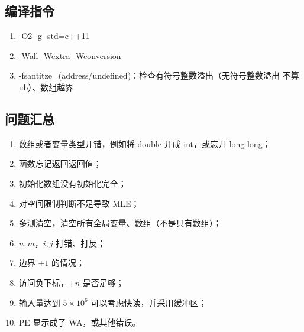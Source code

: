 \subsection{编译指令}
\begin{enumerate}
    \item -O2 -g -std=c++11
    \item -Wall -Wextra -Wconversion
    \item -fsantitze=(address/undefined)：检查有符号整数溢出（无符号整数溢出
        不算 ub）、数组越界
\end{enumerate}
\subsection{问题汇总}
\begin{enumerate}
  \item 数组或者变量类型开错，例如将 double 开成 int，或忘开 long long；
  \item 函数忘记返回返回值；
  \item 初始化数组没有初始化完全；
  \item 对空间限制判断不足导致 MLE；
  \item 多测清空，清空所有全局变量、数组（不是只有数组）；
  \item $n, m$，$i, j$ 打错、打反；
  \item 边界 $\pm 1$ 的情况；
  \item 访问负下标，$+n$ 是否足够；
  \item 输入量达到 $5 \times 10^6$ 可以考虑快读，并采用缓冲区；
  \item PE 显示成了 WA，或其他错误。
\end{enumerate}
